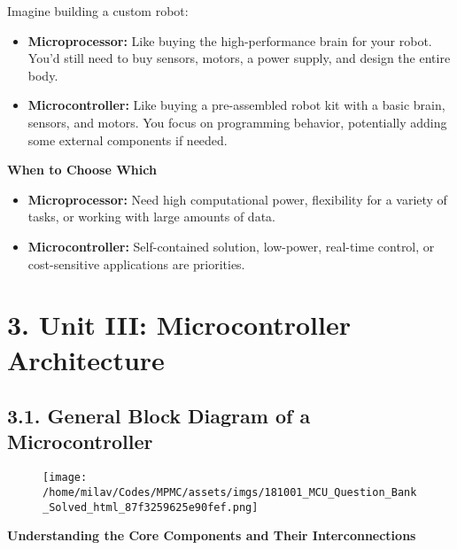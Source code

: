 \documentclass[
]{article}
\begin{document}
Imagine building a custom robot:

\begin{itemize}
\item
  \textbf{Microprocessor:} Like buying the high-performance brain for
  your robot. You'd still need to buy sensors, motors, a power supply,
  and design the entire body.
\item
  \textbf{Microcontroller:} Like buying a pre-assembled robot kit with a
  basic brain, sensors, and motors. You focus on programming behavior,
  potentially adding some external components if needed.
\end{itemize}

\textbf{When to Choose Which}

\begin{itemize}
\item
  \textbf{Microprocessor:} Need high computational power, flexibility
  for a variety of tasks, or working with large amounts of data.
\item
  \textbf{Microcontroller:} Self-contained solution, low-power,
  real-time control, or cost-sensitive applications are priorities.
\end{itemize}

\hypertarget{3-unit-iii-microcontroller-architecture}{%
\section{3. Unit III: Microcontroller
Architecture}\label{3-unit-iii-microcontroller-architecture}}

\hypertarget{31-general-block-diagram-of-a-microcontroller}{%
\subsection{3.1. General Block Diagram of a
Microcontroller}\label{31-general-block-diagram-of-a-microcontroller}}

\begin{figure}
\centering
\texttt{[image: /home/milav/Codes/MPMC/assets/imgs/181001\_MCU\_Question\_Bank\_Solved\_html\_87f3259625e90fef.png]}
\caption{}
\end{figure}

\textbf{Understanding the Core Components and Their Interconnections}
\end{document}
